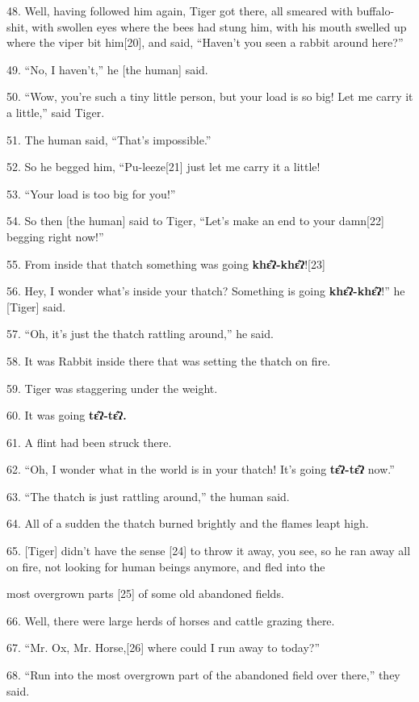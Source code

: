 {48. Well, having followed him again, Tiger got there, all smeared with
buffalo-shit, with swollen eyes where the bees had stung him, with his mouth swelled
up where the viper bit him[20], and said, ``Haven't you seen a rabbit around here?''}

{49. ``No, I haven't,'' he [the human] said.}

{50. ``Wow, you're such a tiny little person, but your load is so big! Let
me carry it a little,'' said Tiger.}

{51. The human said, ``That's impossible.''}

{52. So he begged him, ``Pu-leeze[21] just let me carry it a little!}

{53. ``Your load is too big for you!''}

{54. So then [the human] said to Tiger, ``Let's make an end to your damn[22]
begging right now!''}

{55. From inside that thatch something was going }{\textbf{khɛ̂ʔ-khɛ̂ʔ}}{![23]}

{56. Hey, I wonder what's inside your thatch? Something is going }{\textbf{khɛ̂ʔ-khɛ̂ʔ}}{!''
he [Tiger] said.}

{57. ``Oh, it's just the thatch rattling around,'' he said.}

{58. It was Rabbit inside there that was setting the thatch on fire.}

{59. Tiger was staggering under the weight.}

{60. It was going }{\textbf{tɛ̂ʔ-tɛ̂ʔ.}}

{61. A flint had been struck there.}

{62. ``Oh, I wonder what in the world is in your thatch! It's going }{\textbf{tɛ̂ʔ-tɛ̂ʔ}}{
now.''}

{63. ``The thatch is just rattling around,'' the human said.}

{64.  All of a sudden the thatch burned brightly and the flames leapt high.}

{65. [Tiger] didn't have the sense [24] to throw it away, you see, so he
ran away all on fire, not looking for human beings anymore, and fled  into the
}

{most overgrown parts [25] of some old abandoned fields.}

{66. Well, there were large herds of horses and cattle grazing there.}

{67. ``Mr. Ox, Mr. Horse,[26] where could I run away to today?''}

{68. ``Run into the most overgrown part of the abandoned field over there,''
they said.}


